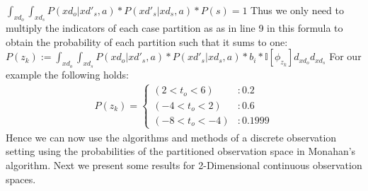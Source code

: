 \documentclass{article} %
\begin{document}
$\int_{xd_o}\int_{xd_s} P(xd_o|xd'_s,a)*P(xd'_s|xd_s,a)*P(s) = 1$
Thus we only need to multiply the indicators of each case partition as as in line 9 in this formula to obtain the probability of each partition such that it sums to one: 
$P(z_k) := \int_{xd_o}\int_{xd_s} P(xd_o|xd'_s,a)*P(xd'_s|xd_s,a)*b_i* \mathbb{I}[\phi_{z_k}] d_{xd_o} d_{xd_s}$
For our example the following holds: 
{\footnotesize
\begin{align}
P(z_k)=
\begin{cases}
 (2<t_o<6) &: 0.2 \\
(-4<t_o<2) &: 0.6\\
(-8<t_o<-4) &:0.1999
\end{cases} 
\nonumber
\end{align}
}
Hence we can now use the algorithms and methods of a discrete observation setting using the probabilities of the partitioned observation space in Monahan's algorithm. 
Next we present some results for 2-Dimensional continuous observation spaces.

\end{document}
